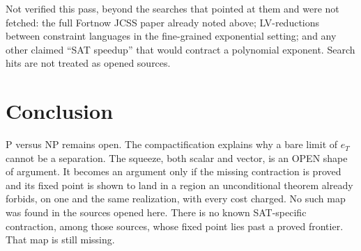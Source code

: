 \documentclass{article}
\begin{document}
Not verified this pass, beyond the searches that pointed at them and were not fetched:
the full Fortnow JCSS paper already noted above;
LV-reductions between constraint languages in the fine-grained exponential setting;
and any other claimed ``SAT speedup'' that would contract a polynomial exponent.
Search hits are not treated as opened sources.

\section{Conclusion}
P versus NP remains open.
The compactification explains why a bare limit of \(e_T\) cannot be a separation.
The squeeze, both scalar and vector, is an OPEN shape of argument.
It becomes an argument only if the missing contraction is proved and its fixed point is shown to land in a region an unconditional theorem already forbids, on one and the same realization, with every cost charged.
No such map was found in the sources opened here.
There is no known SAT-specific contraction, among those sources, whose fixed point lies past a proved frontier.
That map is still missing.
\end{document}
